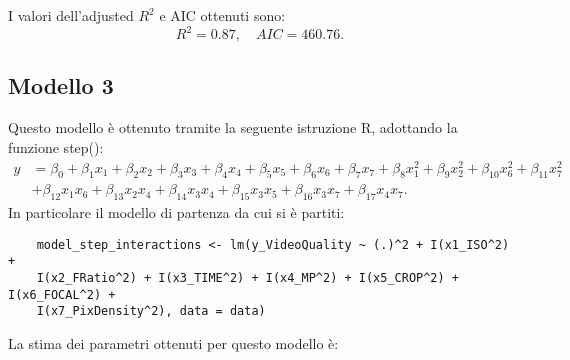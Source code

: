 I valori dell'adjusted $R^2$  e AIC ottenuti sono:
\begin{equation*}
	R^2 =   0.87, \quad AIC = 460.76.
\end{equation*}

\subsection{Modello 3}
Questo modello è ottenuto tramite la seguente istruzione R, adottando la funzione step():
\begin{align*}
	y &= \beta_0 
	+ \beta_1 x_1 + \beta_2 x_2 + \beta_3 x_3 + \beta_4 x_4 + \beta_5 x_5 
	+ \beta_6 x_6 + \beta_7 x_7 
	+ \beta_8 x_1^2 + \beta_9 x_2^2 + \beta_{10} x_6^2 + \beta_{11} x_7^2 \\
	&+ \beta_{12} x_1 x_6 + \beta_{13} x_2 x_4 + \beta_{14} x_3 x_4 
	+ \beta_{15} x_3 x_5 + \beta_{16} x_3 x_7 
	+ \beta_{17} x_4 x_7.
\end{align*}
In particolare il modello di partenza da cui si è partiti:
\begin{verbatim}
	model_step_interactions <- lm(y_VideoQuality ~ (.)^2 + I(x1_ISO^2) + 
	I(x2_FRatio^2) + I(x3_TIME^2) + I(x4_MP^2) + I(x5_CROP^2) + I(x6_FOCAL^2) + 
	I(x7_PixDensity^2), data = data)
\end{verbatim}
La stima dei parametri ottenuti per questo modello è:
